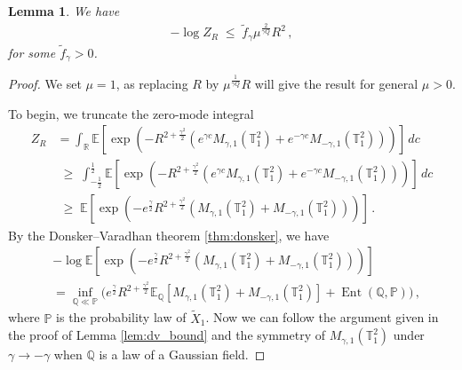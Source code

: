 \documentclass[11pt]{article}
\numberwithin{equation}{section}
\newtheorem{lemma}[theorem]{Lemma}
\theoremstyle{definition}
\renewcommand{\tilde}{\widetilde}          %
\renewcommand{\leq}{\;\leqslant\;}                   %
\renewcommand{\geq}{\;\geqslant\;}                   %
\newcommand{\R}{\mathbb{R}}
\newcommand{\Q}{\mathbb{Q}}
\newcommand{\E}{\mathbb{E}}
\renewcommand{\P}{\mathbb{P}}
\def\T{\mathbb{T}}
\newcommand{\opn}{\operatorname}
\newcommand{\tor}{{\T_1^2}}
\begin{document}
	\begin{lemma}
	We have
  \begin{align}\label{eq_log-ub}
  -\log Z_R \leq \tilde f_\gamma \mu^{\frac{2}{\gamma Q}}  R^2\,,
  \end{align}
  for some $\tilde f_\gamma > 0$.
	\end{lemma} 
	\begin{proof}
	We set $\mu=1$, as replacing $R$ by $\mu^{\frac{1}{\gamma Q}}R$ will give the result for general $\mu > 0$.
	
  To begin, we truncate the zero-mode integral
  \begin{align*}
 Z_R &= \int_\R \mathbb{E}[\exp(-  R^{2+\frac{\gamma^{2}}{2}}( e^{\gamma c} M_{\gamma,1}(\tor)+ e^{-\gamma c} M_{-\gamma,1}(\tor)))] \, dc \\
  &  \geq \int_{-\frac 12}^{\frac 12}  \mathbb{E}[\exp(- R^{2+\frac{\gamma^{2}}{2}}( e^{\gamma c} M_{\gamma,1}(\tor)+ e^{-\gamma c} M_{-\gamma,1}(\tor)))] \, dc \\
  &  \geq \mathbb{E}[\exp(- e^{\frac{\gamma}{2}} R^{2+\frac{\gamma^{2}}{2}}(  M_{\gamma,1}(\tor)+  M_{-\gamma,1}(\tor)))]\,.
  \end{align*}
  By the Donsker--Varadhan theorem \ref{thm:donsker}, we have
  \begin{align*}
  &- \log \mathbb{E}[\exp(- e^{\frac{\gamma}{2}} R^{2+\frac{\gamma^{2}}{2}}(  M_{\gamma,1}(\tor)+  M_{-\gamma,1}(\tor)))] \\
  &= \inf_{\Q \ll \P} \Big( e^{\frac{\gamma}{2}} R^{2 + \frac{\gamma^2}{2}} \E_\Q[M_{\gamma,1}(\tor) + M_{-\gamma,1}(\tor)] + \opn{Ent}(\Q,\P)  \Big)\,,
  \end{align*}
  where $\P$ is the probability law of $\tilde X_1$. Now we can follow the argument given in the proof of Lemma \ref{lem:dv_bound} and the symmetry of $M_{\gamma,1}(\tor)$ under $\gamma \to -\gamma$ when $\Q$ is a law of a Gaussian field.
\end{proof}
\end{document}
